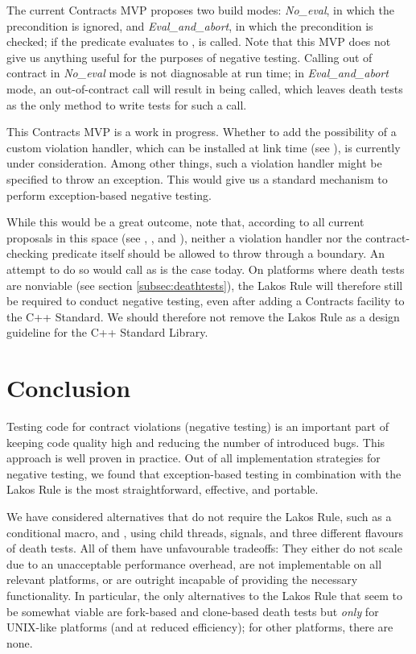 The current Contracts MVP proposes two build modes: \emph{No_eval}, in which the precondition is ignored, and \emph{Eval_and_abort}, in which the precondition is checked; if the predicate evaluates to ,  is called. Note that this MVP does not give us anything useful for the purposes of negative testing. Calling  out of contract in \emph{No_eval} mode is not diagnosable at run time; in \mbox{\emph{Eval_and_abort}} mode, an out-of-contract call will result in  being called, which leaves death tests as the only method to write tests for such a call.

This Contracts MVP is a work in progress. Whether to add the possibility of a custom violation handler, which can be installed at link time (see \cite{P2811R3}), is currently under consideration. Among other things, such a violation handler might be specified to throw an exception. This would give us a standard mechanism to perform exception-based negative testing.

While this would be a great outcome, note that, according to all current proposals in this space (see \cite{P2698R0}, \cite{P2811R3}, and \cite{P2834R0}), neither a violation handler nor the contract-checking predicate itself should be allowed to throw through a  boundary. An attempt to do so would call  as is the case today. On platforms where death tests are nonviable (see section \ref{subsec:deathtests}), the Lakos Rule will therefore still be required to conduct negative testing, even after adding a Contracts facility to the C++ Standard. We should therefore not remove the Lakos Rule as a design guideline for the C++ Standard Library.

\section{Conclusion}

Testing code for contract violations (negative testing) is an important part of keeping code quality high and reducing the number of introduced bugs. This approach is well proven in practice. Out of all implementation strategies for negative testing, we found that exception-based testing in combination with the Lakos Rule is the most straightforward, effective, and portable.

We have considered alternatives that do not require the Lakos Rule, such as a conditional  macro,  and , using child threads, signals, and three different flavours of death tests. All of them have unfavourable tradeoffs: They either do not scale due to an unacceptable performance overhead, are not implementable on all relevant platforms, or are outright incapable of providing the necessary functionality. In particular, the only alternatives to the Lakos Rule that seem to be somewhat viable are fork-based and clone-based death tests but \emph{only} for UNIX-like platforms (and at reduced efficiency); for other platforms, there are none.

